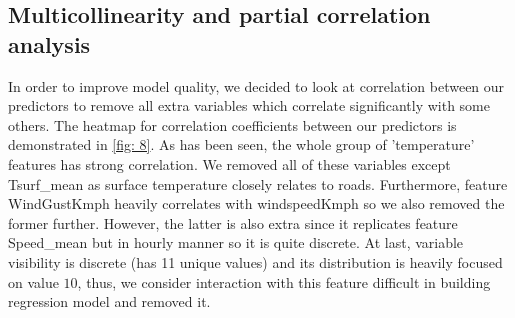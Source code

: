 \documentclass[12pt, bachelor, substylefile = algo_title.rtx]{disser}
\theoremstyle{definition}
\begin{document}
\subsection{Multicollinearity and partial correlation analysis}
In order to improve model quality, we decided to look at correlation between our predictors to remove all extra variables which correlate significantly with some others. The heatmap for correlation coefficients between our predictors is demonstrated in \ref{fig: 8}. As has been seen, the whole group of 'temperature' features has strong correlation. We removed all of these variables except Tsurf\_mean as surface temperature closely relates to roads. Furthermore, feature WindGustKmph heavily correlates with windspeedKmph so we also removed the former further. However, the latter is also extra since it replicates feature Speed\_mean but in hourly manner so it is quite discrete. At last, variable visibility is discrete (has 11 unique values) and its distribution is heavily focused on value $10$, thus, we consider interaction with this feature difficult in building regression model and removed it.
\end{document}
